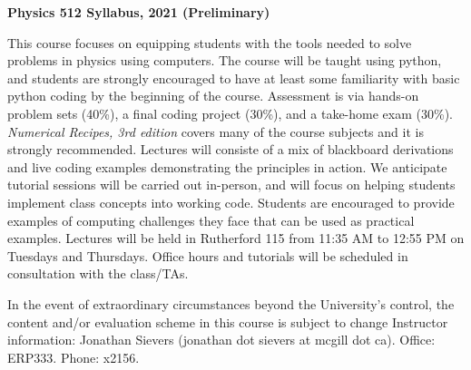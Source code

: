 \documentclass[12]{article}
\begin{document}

\begin{center}{\bf Physics 512 Syllabus, 2021 (Preliminary)}
\end{center}
\vskip 0.1in 
This course focuses on equipping students with the tools
needed to solve problems in physics using computers.  The course will
be taught using python, and students are strongly encouraged to have
at least some familiarity with basic python coding by the beginning of
the course.  Assessment is via hands-on problem sets (40\%), a final
coding project (30\%), and a take-home exam (30\%).
{\textit{Numerical Recipes, 3rd edition}} covers many of the course
subjects and it is strongly recommended.  Lectures will consiste of a
mix of blackboard derivations and live coding examples demonstrating
the principles in action.  We anticipate tutorial sessions will be
carried out in-person, and will focus on helping students implement
class concepts into working code.  Students are encouraged to provide
examples of computing challenges they face that can be used as practical examples. 
\vskip 0.1in
\noindent Lectures will be held in Rutherford 115 from 11:35 AM to 12:55 PM on
Tuesdays and Thursdays.  Office hours and tutorials will be scheduled in
consultation with the class/TAs.

\vskip 0.1in
\noindent In the event of extraordinary circumstances beyond the University's
control, the content and/or evaluation scheme in this course is
subject to change
\vskip 0.1in
\noindent
Instructor information:  Jonathan Sievers (jonathan dot sievers at
mcgill dot ca).  Office: ERP333.  Phone: x2156.
\vskip 0.1in
\end{document}
